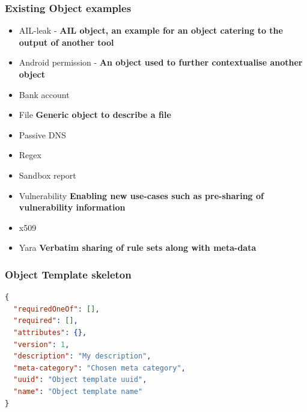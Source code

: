 \begin{frame}
\frametitle{Existing Object examples}
\begin{itemize}
\item AIL-leak - {\bf AIL object, an example for an object catering to the output of another tool}
\item Android permission - {\bf An object used to further contextualise another object}
\item Bank account
\item File {\bf Generic object to describe a file}
\item Passive DNS
\item Regex
\item Sandbox report
\item Vulnerability {\bf Enabling new use-cases such as pre-sharing of vulnerability information}
\item x509
\item Yara {\bf Verbatim sharing of rule sets along with meta-data}
\end{itemize}
\end{frame}


\begin{frame}[fragile]
\frametitle{Object Template skeleton}
\begin{lstlisting}[language=json,firstnumber=1]
{
  "requiredOneOf": [],
  "required": [],
  "attributes": {},
  "version": 1,
  "description": "My description",
  "meta-category": "Chosen meta category",
  "uuid": "Object template uuid",
  "name": "Object template name"
}
\end{lstlisting}
\end{frame}

